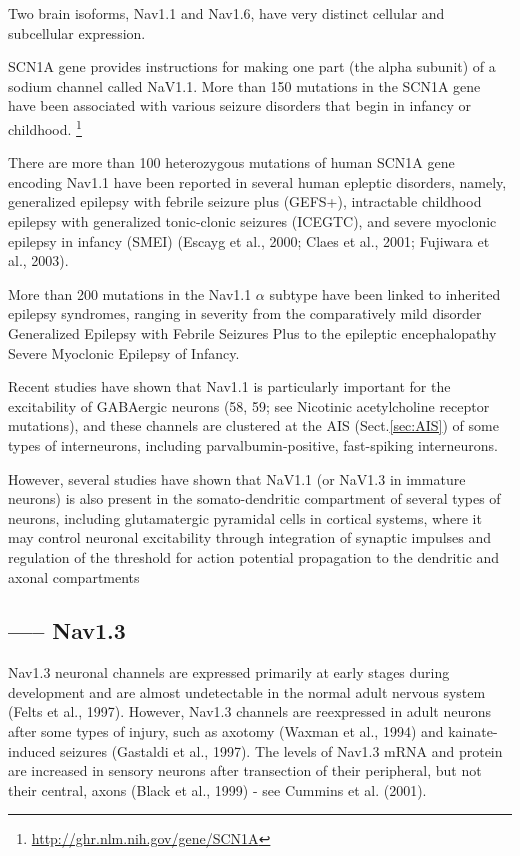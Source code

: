 Two brain isoforms, Nav1.1 and Nav1.6, have very distinct cellular and
subcellular expression. 
  
SCN1A gene provides instructions for making one part (the alpha subunit) of a
sodium channel called NaV1.1. More than 150 mutations in the SCN1A gene have
been associated with various seizure disorders that begin in infancy or
childhood. \footnote{\url{http://ghr.nlm.nih.gov/gene/SCN1A}}
  
There are more than 100 heterozygous mutations of human SCN1A gene encoding
Nav1.1 have been reported in several human epleptic disorders, namely,
generalized epilepsy with febrile seizure plus (GEFS+), intractable childhood
epilepsy with generalized tonic-clonic seizures (ICEGTC), and severe myoclonic
epilepsy in infancy (SMEI) (Escayg et al., 2000; Claes et al., 2001; Fujiwara et
al., 2003).

More than 200 mutations in the Nav1.1 $\alpha$ subtype have been linked to
inherited epilepsy syndromes, ranging in severity from the comparatively mild disorder
Generalized Epilepsy with Febrile Seizures Plus to the epileptic encephalopathy
Severe Myoclonic Epilepsy of Infancy.

Recent studies have shown that Nav1.1 is particularly important for the
excitability of GABAergic neurons (58, 59; see Nicotinic acetylcholine receptor
mutations), and these channels are clustered at the AIS (Sect.\ref{sec:AIS}) of
some types of interneurons, including parvalbumin-positive, fast-spiking interneurons.

However, several studies have shown that NaV1.1 (or NaV1.3 in immature neurons)
is also present in the somato-dendritic compartment of several types of neurons,
including glutamatergic pyramidal cells in cortical systems, where it may
control neuronal excitability through integration of synaptic impulses and
regulation of the threshold for action potential propagation to the dendritic
and axonal compartments


\subsection{----- Nav1.3}
\label{sec:Nav1.3}

Nav1.3 neuronal channels are expressed primarily at early stages during
development and are almost undetectable in the normal adult nervous system
(Felts et al., 1997). However, Nav1.3 channels are reexpressed in adult neurons
after some types of injury, such as axotomy (Waxman et al., 1994) and
kainate-induced seizures (Gastaldi et al., 1997).
The levels of Nav1.3 mRNA and protein are increased in sensory neurons after
transection of their peripheral, but not their central, axons (Black et al.,
1999) - see Cummins et al. (2001).

